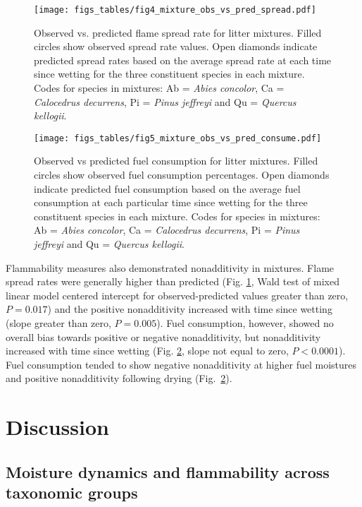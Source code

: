 \documentclass[letterpaper,12pt]{article}
\begin{document}
\begin{figure}
  \centering
\texttt{[image: figs\_tables/fig4\_mixture\_obs\_vs\_pred\_spread.pdf]}
\caption{Observed vs. predicted flame spread rate for litter mixtures. Filled
  circles show observed spread rate values. Open diamonds indicate predicted
  spread rates based on the average spread rate at each time since wetting for
  the three constituent species in each mixture. Codes for species in mixtures:
  Ab = \emph{Abies concolor}, Ca = \emph{Calocedrus decurrens}, Pi =
  \emph{Pinus jeffreyi} and Qu = \emph{Quercus kellogii}.}
  \label{fig:mixture_obs_pred_spread}
\end{figure}


\begin{figure}
  \centering
\texttt{[image: figs\_tables/fig5\_mixture\_obs\_vs\_pred\_consume.pdf]}
\caption{Observed vs predicted fuel consumption for litter mixtures. Filled
  circles show observed fuel consumption percentages. Open diamonds indicate
  predicted fuel consumption based on the average fuel consumption at each
  particular time since wetting for the three constituent species in each
  mixture. Codes for species in mixtures: Ab = \emph{Abies concolor}, Ca =
  \emph{Calocedrus decurrens}, Pi = \emph{Pinus jeffreyi} and Qu =
  \emph{Quercus kellogii}.}
  \label{fig:mixture_obs_pred_consume}
\end{figure}


Flammability measures also demonstrated nonadditivity in mixtures. Flame spread
rates were generally higher than predicted (Fig.
\ref{fig:mixture_obs_pred_spread}, Wald test of mixed linear model centered
intercept for observed-predicted values greater than zero, $P = 0.017$) and the
positive nonadditivity increased with time since wetting (slope greater than
zero, $P = 0.005$). Fuel consumption, however, showed no overall bias towards
positive or negative nonadditivity, but nonadditivity increased with time since
wetting (Fig. \ref{fig:mixture_obs_pred_consume}, slope not equal to zero,
$P < 0.0001$). Fuel consumption tended to show negative nonadditivity at higher
fuel moistures and positive nonadditivity following drying
(Fig.~\ref{fig:mixture_obs_pred_consume}).


\section*{Discussion}

\subsection*{Moisture dynamics and flammability across taxonomic groups}
\end{document}

